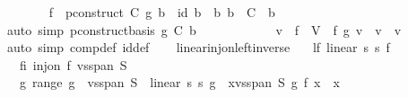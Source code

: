 \begin{isabellebody}
\ \ \ \ \ \ \isamarkupfalse%
\ {\isachardoublequoteopen}{\isacharparenleft}{\kern0pt}f\ {\isasymcirc}\ p{\isachardot}{\kern0pt}construct\ C\ g{\isacharparenright}{\kern0pt}\ b\ {\isacharequal}{\kern0pt}\ id\ b{\isachardoublequoteclose}\ \ b{\isacharcolon}{\kern0pt}\ {\isachardoublequoteopen}b\ {\isasymin}\ C{\isachardoublequoteclose}\ \ b\isanewline
\ \ \ \ \ \ \ \ \isamarkupfalse%
\ {\isacharparenleft}{\kern0pt}auto\ simp{\isacharcolon}{\kern0pt}\ p{\isachardot}{\kern0pt}construct{\isacharunderscore}{\kern0pt}basis\ g\ C\ b{\isacharparenright}{\kern0pt}\isanewline
\ \ \ \ \isamarkupfalse%
\isanewline
\ \ \ \ \isamarkupfalse%
\ \isamarkupfalse%
\ {\isachardoublequoteopen}v\ {\isasymin}\ f\ {\isacharbackquote}{\kern0pt}\ V\ {\isasymLongrightarrow}\ f\ {\isacharparenleft}{\kern0pt}{\isacharquery}{\kern0pt}g\ v{\isacharparenright}{\kern0pt}\ {\isacharequal}{\kern0pt}\ v{\isachardoublequoteclose}\ \ v\ \isamarkupfalse%
\ {\isacharparenleft}{\kern0pt}auto\ simp{\isacharcolon}{\kern0pt}\ comp{\isacharunderscore}{\kern0pt}def\ id{\isacharunderscore}{\kern0pt}def{\isacharparenright}{\kern0pt}\isanewline
\ \ \isamarkupfalse%
\isanewline
{}\isamarkupfalse%
%
\endisatagproof
{\isafoldproof}%
%
\isadelimproof
\isanewline
%
\endisadelimproof
\isanewline
{}\isamarkupfalse%
\ linear{\isacharunderscore}{\kern0pt}inj{\isacharunderscore}{\kern0pt}on{\isacharunderscore}{\kern0pt}left{\isacharunderscore}{\kern0pt}inverse{\isacharcolon}{\kern0pt}\isanewline
\ \ \ lf{\isacharcolon}{\kern0pt}\ {\isachardoublequoteopen}linear\ s{}\ s{}\ f{\isachardoublequoteclose}\isanewline
\ \ \ fi{\isacharcolon}{\kern0pt}\ {\isachardoublequoteopen}inj{\isacharunderscore}{\kern0pt}on\ f\ {\isacharparenleft}{\kern0pt}vs{}{\isachardot}{\kern0pt}span\ S{\isacharparenright}{\kern0pt}{\isachardoublequoteclose}\isanewline
\ \ \ {\isachardoublequoteopen}{\isasymexists}g{\isachardot}{\kern0pt}\ range\ g\ {\isasymsubseteq}\ vs{}{\isachardot}{\kern0pt}span\ S\ {\isasymand}\ linear\ s{}\ s{}\ g\ {\isasymand}\ {\isacharparenleft}{\kern0pt}{\isasymforall}x{\isasymin}vs{}{\isachardot}{\kern0pt}span\ S{\isachardot}{\kern0pt}\ g\ {\isacharparenleft}{\kern0pt}f\ x{\isacharparenright}{\kern0pt}\ {\isacharequal}{\kern0pt}\ x{\isacharparenright}{\kern0pt}{\isachardoublequoteclose}\isanewline

\end{isabellebody}
